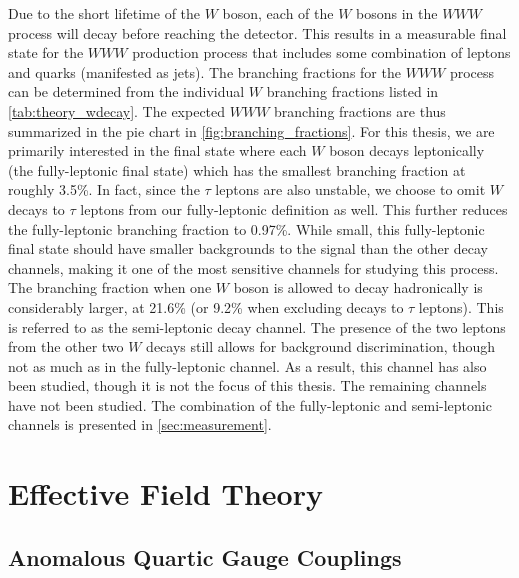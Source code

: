 Due to the short lifetime of the $W$ boson, each of the $W$ bosons
in the $WWW$ process will decay before reaching the detector.
This results in a measurable final state for the $WWW$ production 
process that includes some combination of leptons 
and quarks (manifested as jets).  The branching fractions for 
the $WWW$ process can be determined from the individual $W$ branching fractions
listed in \tab\ref{tab:theory_wdecay}.  The expected $WWW$ branching
fractions are thus summarized in the pie chart in \fig\ref{fig:branching_fractions}.
For this thesis, we are primarily interested in the final state
where each $W$ boson decays leptonically (the fully-leptonic final state) 
which has the smallest branching fraction at roughly 3.5\%.
In fact, since the $\tau$ leptons are also unstable, we choose to 
omit $W$ decays to $\tau$ leptons from our fully-leptonic
definition as well. This further reduces the fully-leptonic 
branching fraction to 0.97\%.  While small, this fully-leptonic final state
should have smaller backgrounds to the signal than the other 
decay channels, making it one of the most sensitive channels for studying
this process. The branching fraction when one $W$ boson is allowed
to decay hadronically is considerably larger, at 21.6\% (or
9.2\% when excluding decays to $\tau$ leptons). This is 
referred to as the semi-leptonic decay channel. The presence
of the two leptons from the other two $W$ decays still allows
for background discrimination, though not as much as in the fully-leptonic
channel. As a result, this channel has also been studied, though it 
is not the focus of this thesis. The remaining channels have
not been studied. The combination of the fully-leptonic
and semi-leptonic channels is presented in \sec\ref{sec:measurement}.



\section{Effective Field Theory}
\subsection{Anomalous Quartic Gauge Couplings}

